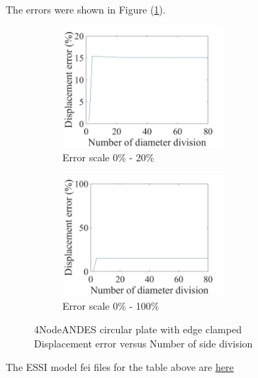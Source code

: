 \documentclass[fleqn,11pt]{article}
\begin{document}
The errors were shown in Figure (\ref{fig 4NodeANDES circular plate with edge clamped}).
\begin{figure}[H]
  \begin{subfigure}{0.5\textwidth}
    \centering
    \includegraphics[width=6cm]{../Figure-files/error4andes_circular_plate_clamped.jpeg}
    \caption{Error scale 0\% - 20\%}
  \end{subfigure}
  \begin{subfigure}{0.5\textwidth}
    \centering
    \includegraphics[width=6cm]{../Figure-files/error4andes_circular_plate_clamped100.jpeg}
    \caption{Error scale 0\% - 100\%}
  \end{subfigure}
  \captionsetup{justification=centering,margin=3cm}
  \caption{4NodeANDES circular plate with edge clamped\\
      Displacement error   versus   Number of side division}
  \label{fig 4NodeANDES circular plate with edge clamped}
\end{figure}



The ESSI model fei files for the table above are \href{https://github.com/yuan-energy/ESSI_Verification/blob/master/4NodeANDES/circular_plate_clamped/circular_plate_clamped.tar.gz?raw=true}{here}














\end{document}
